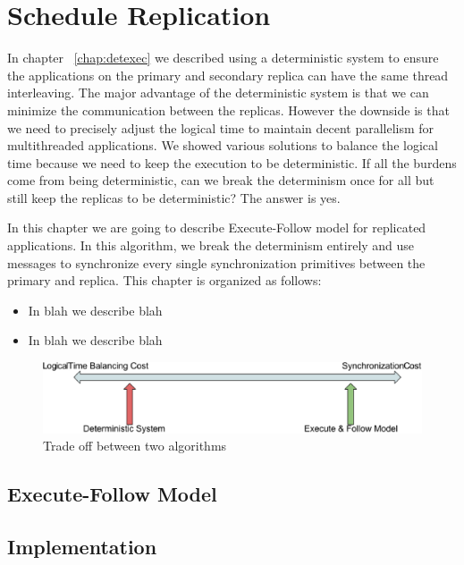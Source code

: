 \chapter{Schedule Replication}
In chapter ~\ref{chap:detexec} we described using a deterministic system to ensure the applications on the primary and secondary replica can have the same thread interleaving. The major advantage of the deterministic system is that we can minimize the communication between the replicas. However the downside is that we need to precisely adjust the logical time to maintain decent parallelism for multithreaded applications. We showed various solutions to balance the logical time because we need to keep the execution to be deterministic. If all the burdens come from being deterministic, can we break the determinism once for all but still keep the replicas to be deterministic? The answer is yes.

In this chapter we are going to describe Execute-Follow model for replicated applications. In this algorithm, we break the determinism entirely and use messages to synchronize every single synchronization primitives between the primary and replica. This chapter is organized as follows:

\begin{itemize}
  \item In blah we describe blah
  \item In blah we describe blah
\end{itemize}

\begin{figure}
\centering
\includegraphics[width=0.8\columnwidth]{figures/tradeoff}
\caption{Trade off between two algorithms}
\label{f:tradeoff}
\end{figure}
\section{Execute-Follow Model}
\section{Implementation}